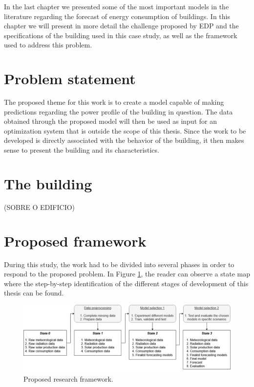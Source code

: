 \cleardoublepage
\label{chap:architecture}


In the last chapter we presented some of the most important models in the literature regarding the forecast of energy consumption of buildings. In this chapter we will present in more detail the challenge proposed by \ac{EDP} and the specifications of the building used in this case study, as well as the framework used to address this problem.

\section{Problem statement}

The proposed theme for this work is to create a model capable of making predictions regarding the power profile of the building in question. The data obtained through the proposed model will then be used as input for an optimization system that is outside the scope of this thesis. Since the work to be developed is directly associated with the behavior of the building, it then makes sense to present the building and its characteristics.



\section{The building}\label{subbuild}

(SOBRE O EDIFICIO)


\section{Proposed framework}\label{propfram}
During this study, the work had to be divided into several phases in order to respond to the proposed problem. In Figure \ref{framework}, the reader can observe a state map where the step-by-step identification of the different stages of development of this thesis can be found.

\begin{figure}[h!]
    \centering
    \begin{center}
    \includegraphics[width=1\textwidth]{Images/framework.png}
    \caption{Proposed research framework.}
    \label{framework}
    \end{center}
\end{figure}

